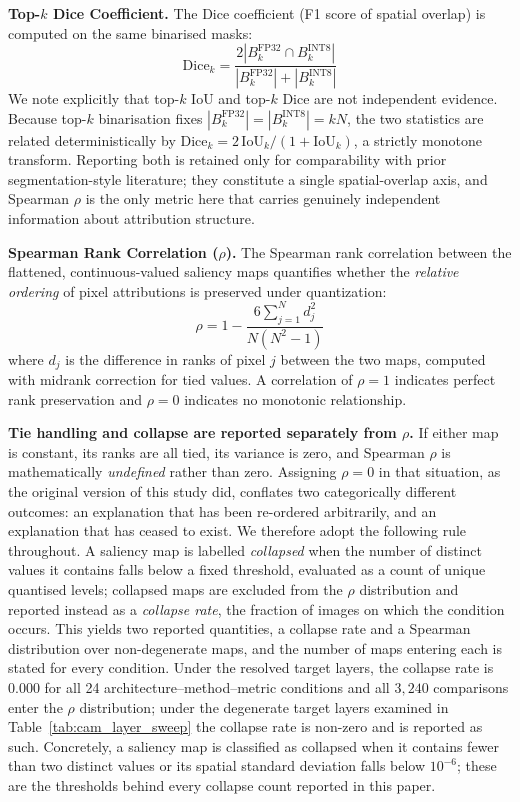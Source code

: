\documentclass[fleqn,10pt]{wlscirep}
\begin{document}
\textbf{Top-$k$ Dice Coefficient.} The Dice coefficient (F1 score of spatial overlap) is computed on the same binarised masks:
\begin{equation}
\text{Dice}_k = \frac{2|B_k^{\text{FP32}} \cap B_k^{\text{INT8}}|}{|B_k^{\text{FP32}}| + |B_k^{\text{INT8}}|}
\label{eq:dice}
\end{equation}
We note explicitly that top-$k$ IoU and top-$k$ Dice are not independent evidence. Because top-$k$ binarisation fixes $|B_k^{\text{FP32}}| = |B_k^{\text{INT8}}| = kN$, the two statistics are related deterministically by $\text{Dice}_k = 2\,\text{IoU}_k / (1 + \text{IoU}_k)$, a strictly monotone transform. Reporting both is retained only for comparability with prior segmentation-style literature; they constitute a single spatial-overlap axis, and Spearman $\rho$ is the only metric here that carries genuinely independent information about attribution structure.

\textbf{Spearman Rank Correlation ($\rho$).} The Spearman rank correlation between the flattened, continuous-valued saliency maps quantifies whether the \emph{relative ordering} of pixel attributions is preserved under quantization:
\begin{equation}
\rho = 1 - \frac{6\sum_{j=1}^{N} d_j^2}{N(N^2 - 1)}
\label{eq:spearman}
\end{equation}
where $d_j$ is the difference in ranks of pixel $j$ between the two maps, computed with midrank correction for tied values. A correlation of $\rho = 1$ indicates perfect rank preservation and $\rho = 0$ indicates no monotonic relationship.

\textbf{Tie handling and collapse are reported separately from $\rho$.} If either map is constant, its ranks are all tied, its variance is zero, and Spearman $\rho$ is mathematically \emph{undefined} rather than zero. Assigning $\rho = 0$ in that situation, as the original version of this study did, conflates two categorically different outcomes: an explanation that has been re-ordered arbitrarily, and an explanation that has ceased to exist. We therefore adopt the following rule throughout. A saliency map is labelled \emph{collapsed} when the number of distinct values it contains falls below a fixed threshold, evaluated as a count of unique quantised levels; collapsed maps are excluded from the $\rho$ distribution and reported instead as a \emph{collapse rate}, the fraction of images on which the condition occurs. This yields two reported quantities, a collapse rate and a Spearman distribution over non-degenerate maps, and the number of maps entering each is stated for every condition. Under the resolved target layers, the collapse rate is $0.000$ for all 24 architecture--method--metric conditions and all $3{,}240$ comparisons enter the $\rho$ distribution; under the degenerate target layers examined in Table~\ref{tab:cam_layer_sweep} the collapse rate is non-zero and is reported as such. Concretely, a saliency map is classified as collapsed when it contains fewer than two distinct values or its spatial standard deviation falls below $10^{-6}$; these are the thresholds behind every collapse count reported in this paper.
\end{document}
